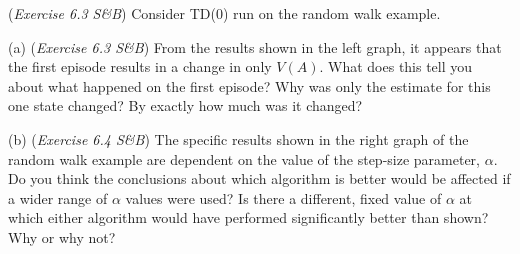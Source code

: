 (\textit{Exercise 6.3 S\&B})
Consider TD(0) run on the random walk example.

(a) (\textit{Exercise 6.3 S\&B}) From the results shown in the left graph, it
appears that the first episode results in a change in only $V(A)$.
What does this tell you about what happened on the first episode?
Why was only the estimate for this one state changed?
By exactly how much was it changed?




(b) (\textit{Exercise 6.4 S\&B})
The specific results shown in the right graph of the random walk example are dependent on the value of the step-size parameter, $\alpha$. Do you think the conclusions about which algorithm is better would be affected if a wider range of $\alpha$ values were used? Is there a different, fixed value of $\alpha$ at which either algorithm would have performed significantly better than shown? Why or why not?

